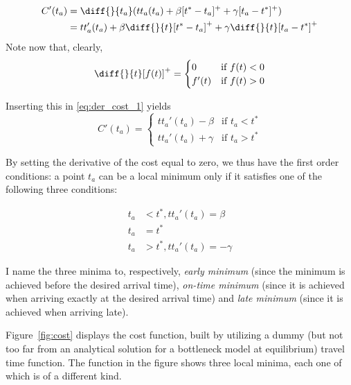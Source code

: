 \begin{equation}
  \label{eq:der_cost_1}
  \begin{split}
    C'(t_a) & = \diff{}{t_a}(tt_a(t_a) + \beta [t^* - t_a]^+ + \gamma [t_a - t^*]^+) \\
            & = tt_a'(t_a) + \beta \diff{}{t}[t^* - t_a]^+ + \gamma \diff{}{t} [t_a - t^*]^+
  \end{split}
\end{equation}
Note now that, clearly,
\begin{equation*}
  \diff{}{t}[f(t)]^+ =
  \begin{cases}
    0 & \text{if } f(t) < 0 \\
    f'(t) & \text{if } f(t) > 0
  \end{cases}
\end{equation*}

Inserting this in \eqref{eq:der_cost_1} yields
\begin{equation}
  \label{eq:der_cost_2}
  C'(t_a) =
  \begin{cases}
    tt_a'(t_a) - \beta & \text{if } t_a < t^* \\
    tt_a'(t_a) + \gamma & \text{if } t_a > t^*
  \end{cases}
\end{equation}

By setting the derivative of the cost equal to zero,
we thus have the first order conditions:
a point \(t_a\) can be a local minimum only if it satisfies one of the following three conditions:

\begin{equation}
  \label{eq:three_minima}
  \begin{split}
    t_a & < t^*, tt_a'(t_a) = \beta \\
    t_a & = t^* \\
    t_a & > t^*, tt_a'(t_a) = -\gamma
  \end{split}
\end{equation}

I name the three minima to, respectively,
\textit{early minimum} (since the minimum is achieved before the desired arrival time),
\textit{on-time minimum} (since it is achieved when arriving exactly at the desired arrival time)
and \textit{late minimum} (since it is achieved when arriving late).

Figure~\ref{fig:cost} displays the cost function, built by utilizing a dummy
(but not too far from an analytical solution for a bottleneck model at equilibrium)
travel time function.
The function in the figure shows three local minima, each one of which is of a different kind.

